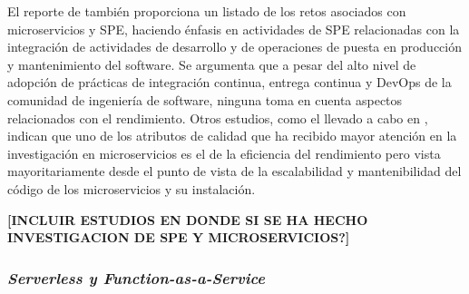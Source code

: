 El reporte de \cite{DBLP:journals/corr/BrunnertHWDHHHJ15} también proporciona un listado de los retos asociados con microservicios y SPE, haciendo énfasis en actividades de SPE relacionadas con la integración de actividades de desarrollo y de operaciones de puesta en producción y mantenimiento del software. Se argumenta que a pesar del alto nivel de adopción de prácticas de integración continua, entrega continua y DevOps de la comunidad de ingeniería de software, ninguna toma en cuenta aspectos relacionados con el rendimiento. Otros estudios, como el llevado a cabo en \cite{7930195}, indican que uno de los atributos de calidad que ha recibido mayor atención en la investigación en microservicios es el de la eficiencia del rendimiento pero vista mayoritariamente desde el punto de vista de la escalabilidad y mantenibilidad del código de los microservicios y su instalación.

\textbf{[INCLUIR ESTUDIOS EN DONDE SI SE HA HECHO INVESTIGACION DE SPE Y MICROSERVICIOS?]}

\subsubsection{\emph{Serverless y Function-as-a-Service}}
%
%

